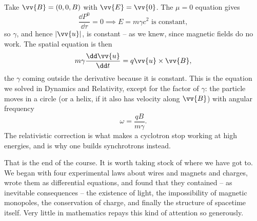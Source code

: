 \begin{example}
	Take $\vv{B} = (0,0,B)$ with $\vv{E} = \vv{0}$. The $\mu = 0$ equation gives
	$$
	\frac{\dd P^0}{\dd\tau} = 0 \implies E = m\gamma c^2 \text{ is constant},
	$$
	so $\gamma$, and hence $|\vv{u}|$, is constant -- as we knew, since magnetic fields do no work. The spatial equation is then
	$$
	m\gamma \frac{\dd \vv{u}}{\dd t} = q\vv{u}\times\vv{B},
	$$
	the $\gamma$ coming outside the derivative because it is constant. This is the equation we solved in Dynamics and Relativity, except for the factor of $\gamma$: the particle moves in a circle (or a helix, if it also has velocity along $\vv{B}$) with angular frequency
	$$
	\omega = \frac{qB}{m\gamma}.
	$$
	The relativistic correction is what makes a cyclotron stop working at high energies, and is why one builds synchrotrons instead.
\end{example}

That is the end of the course. It is worth taking stock of where we have got to. We began with four experimental laws about wires and magnets and charges, wrote them as differential equations, and found that they contained -- as inevitable consequences -- the existence of light, the impossibility of magnetic monopoles, the conservation of charge, and finally the structure of spacetime itself. Very little in mathematics repays this kind of attention so generously.

